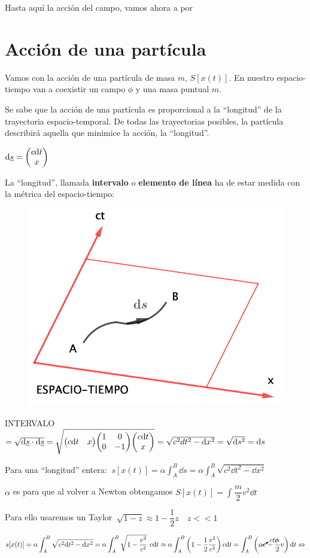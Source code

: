 \color{black}

Hasta aquí la acción del campo, vamos ahora a por

\section{Acción de una partícula}


Vamos con la acción de una partícula de masa $m$, $S[x(t)]$. En nuestro espacio-tiempo van a coexistir un campo $\phi$ y una masa puntual $m$.

Se sabe que la acción de una partícula es proporcional a la ``longitud'' de la trayectoria espacio-temporal. De todas las trayectorias posibles, la partícula describirá aquella que minimice la acción, la ``longitud''.

\begin{multicols}{2}
$\dd \underline s = \mqty(c\dd t \\ x)$

La ``longitud'', llamada \textbf{intervalo} o \textbf{elemento de línea} ha de estar medida con la métrica del espacio-tiempo:

\begin{figure}[H]
	\centering
	\includegraphics[width=.3\textwidth]{imagenes/img33-03.png}
\end{figure}	
\end{multicols}

INTERVALO $=\sqrt{\dd \underline s \cdot \dd \underline s}=\sqrt{\mqty(c \dd t&x)\mqty(1&0\\0&-1)\mqty(c\dd t\\ x)}=\sqrt{c^2\\d t^2-\dd x^2}=\sqrt{\dd s^2}=\dd s$

Para una ``longitud'' entera: $\ \displaystyle s[x(t)]=\alpha \int_A^B\dd s=\alpha \int_A^B \sqrt{c^2 \dd t^2 - \dd x^2}$


$\alpha$ es para que al volver a Newton obtengamos $\displaystyle S[x(t)]=\int \dfrac m 2 v^2 \dd t$

Para ello usaremos un Taylor $\ \sqrt{1-z}\approx 1-\dfrac 1 2 z \quad z<<1$

$ \displaystyle s[x(t)]=\alpha \int_A^B \sqrt{c^2 \dd t^2 - \dd x^2} = \alpha \int_A^B 
\sqrt{1-\dfrac{v^2}{c^2} }\ c \dd t \approx 
\alpha \int_A^B \left( 1-\dfrac 1 2 \dfrac{v^2}{c^2} \right) c\dd t=\int_A^B \left( \cancelto{cte}{\alpha c} - \dfrac \alpha 2 v \right) \dd t \Leftrightarrow$


